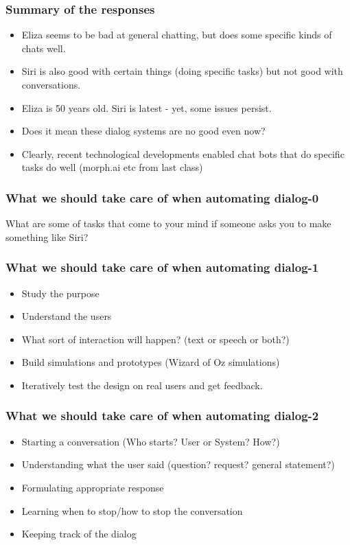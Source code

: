 \documentclass{beamer}
\begin{document}
\begin{frame}
\frametitle{Summary of the responses}
\begin{itemize}
\item Eliza seems to be bad at general chatting, but does some specific kinds of chats well.
\item Siri is also good with certain things (doing specific tasks) but not good with conversations.
\item Eliza is 50 years old. Siri is latest - yet, some issues persist.
\item Does it mean these dialog systems are no good even now? \pause
\item Clearly, recent technological developments enabled chat bots that do specific tasks do well (morph.ai etc from last class)
\end{itemize}
\end{frame}

\begin{frame}
\frametitle{What we should take care of when automating dialog-0}
What are some of tasks that come to your mind if someone asks you to make something like Siri? 
\end{frame}

\begin{frame}
\frametitle{What we should take care of when automating dialog-1}
\begin{itemize}
\item Study the purpose
\item Understand the users
\item What sort of interaction will happen? (text or speech or both?)
\item Build simulations and prototypes (Wizard of Oz simulations)
\item Iteratively test the design on real users and get feedback.
\end{itemize}
\end{frame}

\begin{frame}
\frametitle{What we should take care of when automating dialog-2}
\begin{itemize}
\item Starting a conversation (Who starts? User or System? How?)
\item Understanding what the user said (question? request? general statement?)
\item Formulating appropriate response
\item Learning when to stop/how to stop the conversation
\item Keeping track of the dialog
\end{itemize}
\end{frame}
\end{document}
